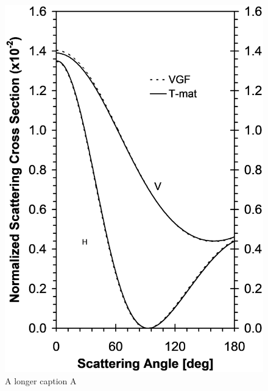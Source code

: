\begin{figure}[htb!]
	\centering
	\begin{minipage}{.45\textwidth}
		\centering
		\includegraphics[width=0.8\linewidth, height=0.35\textheight]{test60b}
		\caption[short caption A]{A longer caption A}
	    \label{fig:bigsphere1}
	\end{minipage} \hfill
	\begin{minipage}{0.45\textwidth}
		\centering

\end{minipage}
\end{figure}
